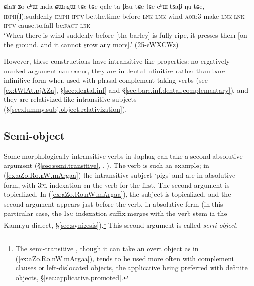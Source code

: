 \begin{exe}
\ex \label{ex:qale.taBzu}
 \gll ɕlaʁ ʑo cʰɯ-mda ɕɯŋgɯ tɕe tɕe qale ta-βzu tɕe tɕe cʰɯ-tʂaβ ŋu tɕe, \\
 \textsc{idph}(I):suddenly \textsc{emph} \textsc{ipfv}-be.the.time before  \textsc{lnk} \textsc{lnk} wind \textsc{aor}:3\flobv{}-make    \textsc{lnk} \textsc{lnk} \textsc{ipfv}-cause.to.fall be:\textsc{fact} \textsc{lnk} \\
 \glt `When there is wind suddenly before [the barley] is fully ripe, it presses them [on the ground, and it cannot grow any more].' (25-cWXCWz)
\end{exe}

However, these constructions have intransitive-like properties: no ergatively marked argument can occur, they are in dental infinitive rather than bare infinitive form when used with phasal com\-ple\-ment-taking verbs (see \ref{ex:tWlAt.pjAZa}, §\ref{sec:dental.inf} and §\ref{sec:bare.inf.dental.complementary}), and they are relativized like intransitive subjects (§\ref{sec:dummy.subj.object.relativization}).

\subsection{Semi-object} \label{sec:semi.object}
   
Some morphologically intransitive verbs in Japhug can take a second absolutive argument (§\ref{sec:semi.transitive}, \citealt[4--5]{jacques16relatives},  \citealt[224]{jacques16complementation}). The verb  is such an example; in (\ref{ex:aZo.Ro.nW.mArgaa}) the intransitive subject  `pigs' and  are in absolutive form, with  \textsc{3pl} indexation on the verb for the first. The second argument   is topicalized. In (\ref{ex:aZo.Ro.nW.mArgaa}), the subject is topicalized, and the second argument   appears just before the verb, in absolutive form (in this particular case, the \textsc{1sg} indexation suffix merges with the verb stem in the Kamnyu dialect, §\ref{sec:synizesis}).\footnote{The semi-transitive , though it can take an overt object as in  (\ref{ex:aZo.Ro.nW.mArgaa}), tends to be used more often with complement clauses or left-dislocated objects, the applicative  being preferred with definite objects, §\ref{sec:applicative.promoted}.} This second argument is called \textit{semi-object}.

